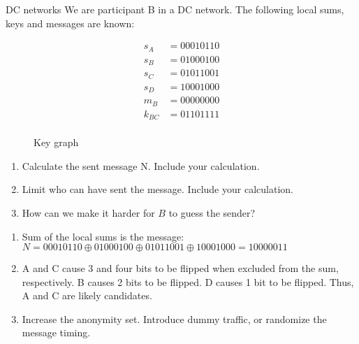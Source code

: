 \documentclass{article}
\begin{document}
\begin{exercise}{DC networks}
  We are participant B in a DC network. The following local sums, keys and messages are known:

  \begin{align*}
    s_A &= 00010110 \\
    s_B &= 01000100 \\
    s_C &= 01011001 \\
    s_D &= 10001000 \\
    m_B &= 00000000 \\
    k_{BC} &= 01101111 \\
  \end{align*}

  \begin{figure}
    \center
    \caption{Key graph}
  \end{figure}

  \begin{enumerate}
    \item Calculate the sent message N. Include your calculation.
    \item Limit who can have sent the message. Include your calculation.
    \item How can we make it harder for $B$ to guess the sender?
  \end{enumerate}

  \begin{solution}
    \begin{enumerate}
      \item Sum of the local sums is the message: $N = 00010110 \oplus 01000100 \oplus 01011001 \oplus 10001000 = 10000011$
      \item A and C cause 3 and four bits to be flipped when excluded from the sum, respectively. B causes 2 bits to be flipped. D causes 1 bit to be flipped. Thus, A and C are likely candidates.
      \item Increase the anonymity set. Introduce dummy traffic, or randomize the message timing.
    \end{enumerate}
  \end{solution}
\end{exercise}
\end{document}
